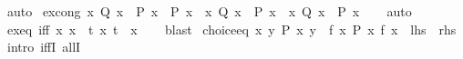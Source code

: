 \begin{isabellebody}
\ auto%
\endisatagproof
{\isafoldproof}%
%
\isadelimproof
\isanewline
%
\endisadelimproof
\isanewline
{}\isamarkupfalse%
\ ex{\isacharunderscore}{\kern0pt}cong{\isacharcolon}{\kern0pt}\ {\isachardoublequoteopen}{\isacharparenleft}{\kern0pt}{\isasymAnd}x{\isachardot}{\kern0pt}\ Q\ x\ {\isasymLongrightarrow}\ P\ x\ {\isacharequal}{\kern0pt}\ P{\isacharprime}{\kern0pt}\ x{\isacharparenright}{\kern0pt}\ {\isasymLongrightarrow}\ {\isacharparenleft}{\kern0pt}{\isasymexists}x{\isachardot}{\kern0pt}\ Q\ x\ {\isasymand}\ P\ x{\isacharparenright}{\kern0pt}\ {\isacharequal}{\kern0pt}\ {\isacharparenleft}{\kern0pt}{\isasymexists}x{\isachardot}{\kern0pt}\ Q\ x\ {\isasymand}\ P{\isacharprime}{\kern0pt}\ x{\isacharparenright}{\kern0pt}{\isachardoublequoteclose}\isanewline
%
\isadelimproof
\ \ %
\endisadelimproof
%
\isatagproof
{}\isamarkupfalse%
\ auto%
\endisatagproof
{\isafoldproof}%
%
\isadelimproof
\isanewline
%
\endisadelimproof
\isanewline
{}\isamarkupfalse%
\ ex{}{\isacharunderscore}{\kern0pt}eq\ {\isacharbrackleft}{\kern0pt}iff{\isacharbrackright}{\kern0pt}{\isacharcolon}{\kern0pt}\ {\isachardoublequoteopen}{\isasymexists}{\isacharbang}{\kern0pt}x{\isachardot}{\kern0pt}\ x\ {\isacharequal}{\kern0pt}\ t{\isachardoublequoteclose}\ {\isachardoublequoteopen}{\isasymexists}{\isacharbang}{\kern0pt}x{\isachardot}{\kern0pt}\ t\ {\isacharequal}{\kern0pt}\ x{\isachardoublequoteclose}\isanewline
%
\isadelimproof
\ \ %
\endisadelimproof
%
\isatagproof
{}\isamarkupfalse%
\ blast{\isacharplus}{\kern0pt}%
\endisatagproof
{\isafoldproof}%
%
\isadelimproof
\isanewline
%
\endisadelimproof
\isanewline
{}\isamarkupfalse%
\ choice{\isacharunderscore}{\kern0pt}eq{\isacharcolon}{\kern0pt}\ {\isachardoublequoteopen}{\isacharparenleft}{\kern0pt}{\isasymforall}x{\isachardot}{\kern0pt}\ {\isasymexists}{\isacharbang}{\kern0pt}y{\isachardot}{\kern0pt}\ P\ x\ y{\isacharparenright}{\kern0pt}\ {\isacharequal}{\kern0pt}\ {\isacharparenleft}{\kern0pt}{\isasymexists}{\isacharbang}{\kern0pt}f{\isachardot}{\kern0pt}\ {\isasymforall}x{\isachardot}{\kern0pt}\ P\ x\ {\isacharparenleft}{\kern0pt}f\ x{\isacharparenright}{\kern0pt}{\isacharparenright}{\kern0pt}{\isachardoublequoteclose}\ {\isacharparenleft}{\kern0pt}\ {\isachardoublequoteopen}{\isacharquery}{\kern0pt}lhs\ {\isacharequal}{\kern0pt}\ {\isacharquery}{\kern0pt}rhs{\isachardoublequoteclose}{\isacharparenright}{\kern0pt}\isanewline
%
\isadelimproof
%
\endisadelimproof
%
\isatagproof
{}\isamarkupfalse%
\ {\isacharparenleft}{\kern0pt}intro\ iffI\ allI{\isacharparenright}{\kern0pt}\isanewline

\end{isabellebody}
